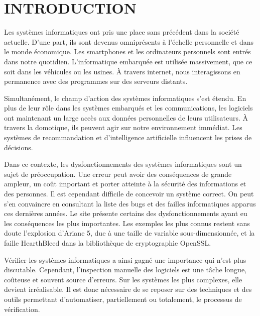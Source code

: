
\chapter{INTRODUCTION}\label{sec:Introduction}  %

Les systèmes informatiques ont pris une place sans précédent dans la société
actuelle. D'une part, ils sont devenus omniprésents à l'échelle personnelle et
dans le monde économique. Les smartphones et les ordinateurs personnels sont
entrés dans notre quotidien. L'informatique embarquée est utilisée massivement,
que ce soit dans les véhicules ou les usines. À travers internet, nous
interagissons en permanence avec des programmes sur des serveurs distants.

Simultanément, le champ d'action des systèmes informatiques s'est étendu. En
plus de leur rôle dans les systèmes embarqués et les communications, les
logiciels ont maintenant un large accès aux données personnelles de leurs
utilisateurs. À travers la domotique, ils peuvent agir sur notre environnement
immédiat. Les systèmes de recommandation et d'intelligence artificielle
influencent les prises de décisions.

Dans ce contexte, les dysfonctionnements des systèmes informatiques sont un
sujet de préoccupation. Une erreur peut avoir des conséquences de grande
ampleur, un coût important et porter atteinte à la sécurité des informations et
des personnes. Il est cependant difficile de concevoir un système correct. On
peut s'en convaincre en consultant la liste des bugs et des failles
informatiques apparus ces dernières années. Le site \cite{horror_story} présente
certains des dysfonctionnements ayant eu les conséquences les plus importantes.
Les exemples les plus connus restent sans doute l'explosion d'Ariane 5, due à
une taille de variable sous-dimensionnée, et la faille HearthBleed dans la
bibliothèque de cryptographie OpenSSL.

Vérifier les systèmes informatiques a ainsi gagné une importance qui n'est
plus discutable. Cependant, l'inspection manuelle des logiciels est une
tâche longue, coûteuse et souvent source d'erreurs. Sur les systèmes les
plus complexes, elle devient irréalisable. Il est donc nécessaire de se
reposer sur des techniques et des outils permettant d'automatiser,
partiellement ou totalement, le processus de vérification.


